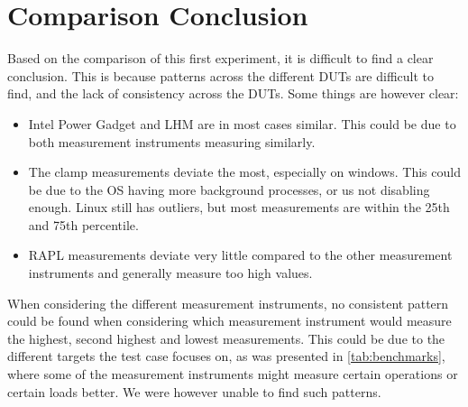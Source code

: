 \section{Comparison Conclusion}

Based on the comparison of this first experiment, it is difficult to find a clear conclusion. This is because patterns across the different DUTs are difficult to find, and the lack of consistency across the DUTs. Some things are however clear:

\begin{itemize}
    \item Intel Power Gadget and LHM are in most cases similar. This could be due to both measurement instruments measuring similarly.
    \item The clamp measurements deviate the most, especially on windows. This could be due to the OS having more background processes, or us not disabling enough. Linux still has outliers, but most measurements are within the 25th and 75th percentile.
    \item RAPL measurements deviate very little compared to the other measurement instruments and generally measure too high values.
\end{itemize}

When considering the different measurement instruments, no consistent pattern could be found when considering which measurement instrument would measure the highest, second highest and lowest measurements. This could be due to the different targets the test case focuses on, as was presented in \cref{tab:benchmarks}, where some of the measurement instruments might measure certain operations or certain loads better. We were however unable to find such patterns.

